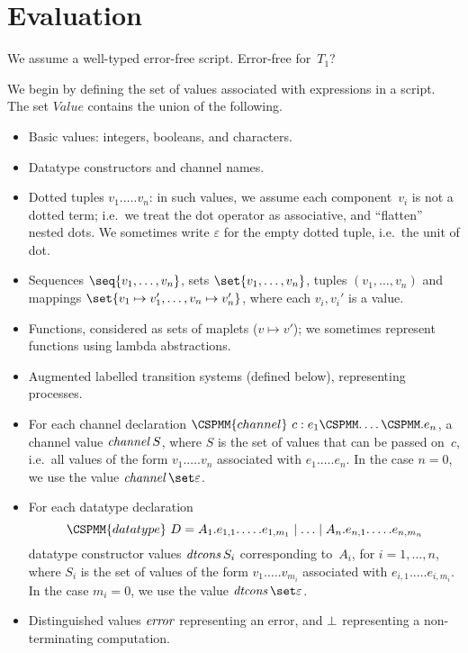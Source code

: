 \section{Evaluation}

We assume a well-typed error-free script.  \framebox{**} Error-free for~$T_1$? 

We begin by defining the set of values associated with expressions in a
script.  The set $Value$ contains the union of the following. 
%
\begin{itemize}
\item Basic values: integers, booleans, and characters.

\item Datatype constructors and channel names.

\item Dotted tuples $v_1.\ldots.v_n$: in such values, we assume each
  component~$v_i$ is not a dotted term; i.e.~we treat the dot operator as
  associative, and ``flatten'' nested dots.  We sometimes write $\varepsilon$
  for the empty dotted tuple, i.e.~the unit of dot.

\item Sequences $\seq{v_1,\ldots,v_n}$, sets
  $\set{v_1,\ldots,v_n}$, tuples $(v_1,\ldots,v_n)$ and mappings
  $\set{v_1 \mapsto v_1', \ldots, v_n \mapsto v_n'}$, where each $v_i, v_i'$
  is a value.

\item Functions, considered as sets of maplets ($v \mapsto v'$); we sometimes
  represent functions using lambda abstractions.

\item Augmented labelled transition systems (defined below), representing
  processes.

\item For each channel declaration $\CSPMM{channel}~c : e_1\M.\ldots\M.e_n$, a
  channel value $\mathop{\it channel} S$, where $S$ is the set of values that can be
  passed on~$c$, i.e.~all values of the form $v_1.\ldots.v_n$ associated with
  $e_1.\ldots.e_n$.  In the case $n=0$, we use the value
  $\channel \set\varepsilon$.  

\item For each datatype declaration
\[
\CSPMM{datatype}~D = 
  A_1.e_{1,1}.\ldots.e_{1,m_1} \mid \ldots \mid A_n.e_{n,1}.\ldots.e_{n,m_n}
\]
datatype constructor values $\mathop{\it dtcons} S_i$ corresponding to~$A_i$, for
$i = 1,\ldots,n$, where $S_i$ is the set of values of the form
$v_1.\ldots.v_{m_i}$ associated with $e_{i,1}.\ldots.e_{i,m_i}$.  In the case
$m_i=0$, we use the value $\dtcons\set\varepsilon$.

\item Distinguished values $\mathord{\it error}$ representing an error, and $\perp$
  representing a non-terminating computation.
\end{itemize}

